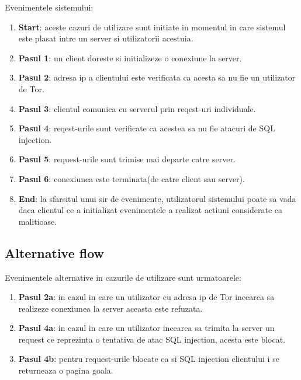 Evenimentele sistemului:
\begin{enumerate}
	\item \textbf{Start}: aceste cazuri de utilizare sunt initiate in momentul in care sistemul este plasat intre un server si utilizatorii acestuia.
	\item \textbf{Pasul 1}: un client doreste si initializeze o conexiune la server.
	\item \textbf{Pasul 2}: adresa ip a clientului este verificata ca acesta sa nu fie un utilizator de Tor.
	\item \textbf{Pasul 3}: clientul comunica cu serverul prin reqest-uri individuale.
	\item \textbf{Pasul 4}: reqest-urile sunt verificate ca acestea sa nu fie atacuri de SQL injection.
	\item \textbf{Pasul 5}: request-urile sunt trimise mai departe catre server.
	\item \textbf{Pasul 6}: conexiunea este terminata(de catre client sau server).
	\item \textbf{End}: la sfarsitul unui sir de evenimente, utilizatorul sistemului poate sa vada daca clientul ce a initializat evenimentele a realizat actiuni considerate ca malitioase.
	
	
\end{enumerate}


\subsection{Alternative flow}
Evenimentele alternative in cazurile de utilizare sunt urmatoarele:
\begin{enumerate}
	\item \textbf{Pasul 2a}: in cazul in care un utilizator cu adresa ip de Tor incearca sa realizeze conexiunea la server aceasta este refuzata. 
	\item \textbf{Pasul 4a}: in cazul in care un utilizator incearca sa trimita la server un request ce reprezinta o tentativa de atac SQL injection, acesta este blocat.
	\item \textbf{Pasul 4b}: pentru request-urile blocate ca si SQL injection clientului i se returneaza o pagina goala. 
\end{enumerate}

\newpage


